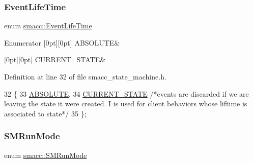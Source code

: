 \subsubsection{\texorpdfstring{Event\+Life\+Time}{EventLifeTime}}
{\footnotesize\ttfamily enum \hyperlink{namespacesmacc_a5063f47926ad2fe25120ed4b1e7b2c7e}{smacc\+::\+Event\+Life\+Time}\hspace{0.3cm}{\ttfamily [strong]}}

\begin{DoxyEnumFields}{Enumerator}
[0pt][0pt]{}\mbox{\label{namespacesmacc_a5063f47926ad2fe25120ed4b1e7b2c7ea3a0bc063b6db8cae0361657958be836f}} 
A\+B\+S\+O\+L\+U\+TE&\\
\hline

[0pt][0pt]{}\mbox{\label{namespacesmacc_a5063f47926ad2fe25120ed4b1e7b2c7ea49b599d413671f16f08d0dd18243c294}} 
C\+U\+R\+R\+E\+N\+T\+\_\+\+S\+T\+A\+TE&\\
\hline

\end{DoxyEnumFields}


Definition at line 32 of file smacc\+\_\+state\+\_\+machine.\+h.


\begin{DoxyCode}
32                         \{
33     \hyperlink{namespacesmacc_a5063f47926ad2fe25120ed4b1e7b2c7ea3a0bc063b6db8cae0361657958be836f}{ABSOLUTE},
34     \hyperlink{namespacesmacc_a5063f47926ad2fe25120ed4b1e7b2c7ea49b599d413671f16f08d0dd18243c294}{CURRENT\_STATE} \textcolor{comment}{/*events are discarded if we are leaving the state it were created. I is
       used for client behaviors whose liftime is associated to state*/}
35 \};
\end{DoxyCode}
\mbox{\label{namespacesmacc_a3e4f79486ea6ea6342dd3c712d16a4f6}} 
\subsubsection{\texorpdfstring{S\+M\+Run\+Mode}{SMRunMode}}
{\footnotesize\ttfamily enum \hyperlink{namespacesmacc_a3e4f79486ea6ea6342dd3c712d16a4f6}{smacc\+::\+S\+M\+Run\+Mode}\hspace{0.3cm}{\ttfamily [strong]}}

